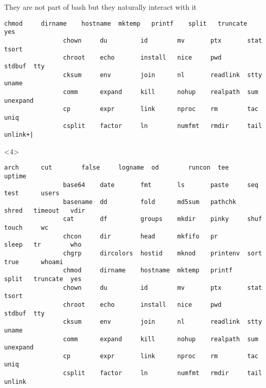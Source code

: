 \begin{frame}[fragile]{They are not part of bash but they naturally interact with it}
\begin{overlayarea}{\textwidth}{0.6\textheight}
\begin{onlyenv}
\begin{lstlisting}[style=myBash, style=smaller, numbers=none, aboveskip=3mm]
                chmod     dirname    hostname  mktemp   printf    split   truncate  yes
                chown     du         id        mv       ptx       stat    tsort
                chroot    echo       install   nice     pwd       stdbuf  tty
                cksum     env        join      nl       readlink  stty    uname
                comm      expand     kill      nohup    realpath  sum     unexpand
                cp        expr       link      nproc    rm        tac     uniq
                csplit    factor     ln        numfmt   rmdir     tail    unlink+|
            \end{lstlisting}
        \end{onlyenv}
        \begin{onlyenv}<4>
            \begin{lstlisting}[style=myBash, style=smaller, numbers=none, aboveskip=3mm, belowskip=-8mm, deletekeywords={env, expr, nice, nohup}]
                arch      cut        false     logname  od        runcon  tee       uptime
                base64    date       fmt       ls       paste     seq     test      users
                basename  dd         fold      md5sum   pathchk   shred   timeout   vdir
                cat       df         groups    mkdir    pinky     shuf    touch     wc
                chcon     dir        head      mkfifo   pr        sleep   tr        who
                chgrp     dircolors  hostid    mknod    printenv  sort    true      whoami
                chmod     dirname    hostname  mktemp   printf    split   truncate  yes
                chown     du         id        mv       ptx       stat    tsort
                chroot    echo       install   nice     pwd       stdbuf  tty
                cksum     env        join      nl       readlink  stty    uname
                comm      expand     kill      nohup    realpath  sum     unexpand
                cp        expr       link      nproc    rm        tac     uniq
                csplit    factor     ln        numfmt   rmdir     tail    unlink
            \end{lstlisting}
        \end{onlyenv}
    \end{overlayarea}
\end{frame}
